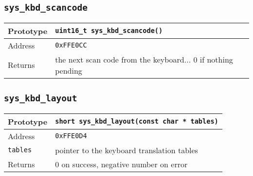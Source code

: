 \subsection*{\texttt{sys\_kbd\_scancode}}
\begin{tabular}{|l||l|} \hline
Prototype & \lstinline!uint16_t sys_kbd_scancode()! \\ \hline
Address & \texttt{0xFFE0CC} \\ \hline
Returns & the next scan code from the keyboard... 0 if nothing pending \\ \hline
\end{tabular}

\subsection*{\texttt{sys\_kbd\_layout}}
\begin{tabular}{|l||l|} \hline
Prototype & \lstinline!short sys_kbd_layout(const char * tables)! \\ \hline
Address & \texttt{0xFFE0D4} \\ \hline
\lstinline!tables! & pointer to the keyboard translation tables \\ \hline
Returns & 0 on success, negative number on error \\ \hline
\end{tabular}

